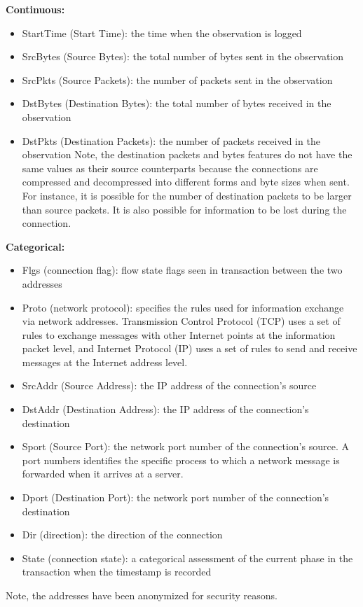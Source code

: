 \documentclass[12pt,twoside]{dukestatscithesis}
\providecommand{\tightlist}{%
  \setlength{\itemsep}{0pt}\setlength{\parskip}{0pt}}
\theoremstyle{definition}
\theoremstyle{definition}
\theoremstyle{definition}
\theoremstyle{remark}
\begin{document}
\textbf{Continuous:}
\begin{itemize}
\tightlist
\item
  StartTime (Start Time): the time when the observation is logged
\item
  SrcBytes (Source Bytes): the total number of bytes sent in the
  observation
\item
  SrcPkts (Source Packets): the number of packets sent in the
  observation
\item
  DstBytes (Destination Bytes): the total number of bytes received in
  the observation
\item
  DstPkts (Destination Packets): the number of packets received in the
  observation Note, the destination packets and bytes features do not
  have the same values as their source counterparts because the
  connections are compressed and decompressed into different forms and
  byte sizes when sent. For instance, it is possible for the number of
  destination packets to be larger than source packets. It is also
  possible for information to be lost during the connection.
\end{itemize}
\textbf{Categorical:}
\begin{itemize}
\tightlist
\item
  Flgs (connection flag): flow state flags seen in transaction between
  the two addresses
\item
  Proto (network protocol): specifies the rules used for information
  exchange via network addresses. Transmission Control Protocol (TCP)
  uses a set of rules to exchange messages with other Internet points at
  the information packet level, and Internet Protocol (IP) uses a set of
  rules to send and receive messages at the Internet address level.
\item
  SrcAddr (Source Address): the IP address of the connection's source
\item
  DstAddr (Destination Address): the IP address of the connection's
  destination
\item
  Sport (Source Port): the network port number of the connection's
  source. A port numbers identifies the specific process to which a
  network message is forwarded when it arrives at a server.
\item
  Dport (Destination Port): the network port number of the connection's
  destination
\item
  Dir (direction): the direction of the connection
\item
  State (connection state): a categorical assessment of the current
  phase in the transaction when the timestamp is recorded
\end{itemize}
Note, the addresses have been anonymized for security reasons.
\end{document}
